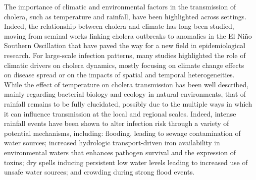 The importance of climatic and environmental factors in the transmission of cholera, such as temperature and rainfall, have been highlighted across settings. Indeed, the relationship between cholera and climate has long been studied, moving from seminal works linking cholera outbreaks to anomalies in the El Niño Southern Oscillation\cite{Colwell:GlobalClimateInfectious:1996, Pascual:CholeraDynamicsNinoSouthern:2000, Hashizume:DifferentialEffectIndian:2013} that have paved the way for a new field in epidemiological research. For large-scale infection patterns, many studies highlighted the role of climatic drivers on cholera dynamics, mostly focusing on climate change effects on disease spread\cite{Rinaldo:ModelingKeyDrivers:2017,Hashizume:EffectRainfallIncidence:2008,Magny:CholeraOutbreakSenegal:2012,Rodo:ClimateChangeInfectious:2013,Ramirez:NinoClimateCholera:2016,Vezzulli:ClimateInfluenceVibrio:2016, Rinaldo:ModelingKeyDrivers:2017} or on the impacts of spatial and temporal heterogeneities\cite{Reiner:HighlyLocalizedSensitivity:2012, Baker-Austin:EmergingVibrioRisk:2013, Vezzulli:OceanWarmingSpread:2013, Cash:CholeraShigellosisDifferent:2014,Escobar:GlobalMapSuitability:2015, Vezzulli:EffectsGlobalWarming:2015,Perez-Saez:ClimatedrivenEndemicCholera:2017}. While the effect of temperature on cholera transmission has been well described, mainly regarding bacterial biology and ecology in natural environments, that of rainfall remains to be fully elucidated, possibly due to the multiple ways in which it can influence transmission at the local and regional scales\cite{Rinaldo:Reassessment20102011:2012,Eisenberg:ExaminingRainfallCholera:2013,Baracchini:SeasonalityCholeraDynamics:2017}. Indeed, intense rainfall events have been shown to alter infection risk through a variety of potential mechanisms, including: flooding, leading to sewage contamination of water sources\cite{Ruiz-Moreno:CholeraSeasonalityMadras:2007, Hashizume:EffectRainfallIncidence:2008}; increased hydrologic transport-driven iron availability in environmental waters that enhances pathogen survival and the expression of toxins\cite{Lipp:EffectsGlobalClimate:2002,Faruque:SeasonalEpidemicsCholera:2005, Hill:ToxigenicVibrioCholerae:2011}; dry spells inducing persistent low water levels leading to increased use of unsafe water sources\cite{Rebaudet:EnvironmentalDeterminantsCholera:2013}; and crowding during strong flood events\cite{Reiner:HighlyLocalizedSensitivity:2012}.


